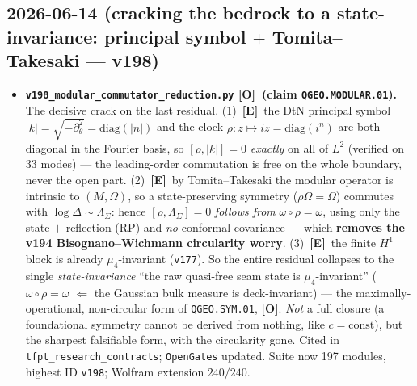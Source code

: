 \documentclass[11pt]{article}
\providecommand{\mE}{\textbf{[E]}}\providecommand{\mC}{\textbf{[C]}}
\providecommand{\mO}{\textbf{[O]}}\providecommand{\mX}{\textbf{[X]}}
\providecommand{\vref}[1]{\texttt{#1}}
\begin{document}
\subsection*{2026-06-14 (cracking the bedrock to a state-invariance: principal symbol $+$ Tomita--Takesaki --- v198)}
\begin{itemize}
\item \textbf{\texttt{v198\_modular\_commutator\_reduction.py} \mO\ (claim \texttt{QGEO.MODULAR.01}).} The
  decisive crack on the last residual. (1)~\mE\ the DtN principal symbol
  $|k|=\sqrt{-\partial_\theta^2}=\mathrm{diag}(|n|)$ and the clock $\rho{:}z\mapsto iz=\mathrm{diag}(i^n)$ are
  both diagonal in the Fourier basis, so $[\rho,|k|]=0$ \emph{exactly} on all of $L^2$ (verified on 33
  modes) --- the leading-order commutation is free on the whole boundary, never the open part. (2)~\mE\ by
  Tomita--Takesaki the modular operator is intrinsic to $(M,\Omega)$, so a state-preserving symmetry
  ($\rho\Omega=\Omega$) commutes with $\log\Delta\sim\Lambda_\Sigma$: hence $[\rho,\Lambda_\Sigma]=0$
  \emph{follows from} $\omega\circ\rho=\omega$, using only the state $+$ reflection (RP) and \emph{no}
  conformal covariance --- which \textbf{removes the v194 Bisognano--Wichmann circularity worry}. (3)~\mE\
  the finite $H^1$ block is already $\mu_4$-invariant (\vref{v177}). So the entire residual collapses to the
  single \emph{state-invariance} ``the raw quasi-free seam state is $\mu_4$-invariant''
  ($\omega\circ\rho=\omega$ $\Leftarrow$ the Gaussian bulk measure is deck-invariant) --- the
  maximally-operational, non-circular form of \texttt{QGEO.SYM.01}, \mO. \emph{Not} a full closure (a
  foundational symmetry cannot be derived from nothing, like $c=\text{const}$), but the sharpest falsifiable
  form, with the circularity gone. Cited in \texttt{tfpt\_research\_contracts}; \texttt{OpenGates} updated.
  Suite now 197 modules, highest ID \texttt{v198}; Wolfram extension $240/240$.
\end{itemize}
\end{document}
